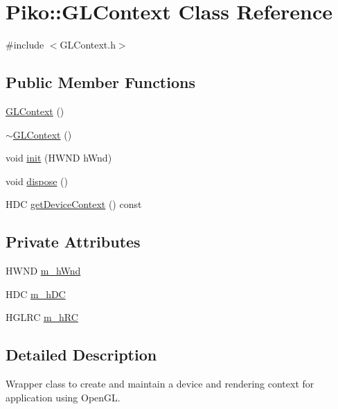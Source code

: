 \hypertarget{class_piko_1_1_g_l_context}{\section{Piko\-:\-:G\-L\-Context Class Reference}
\label{de/d00/class_piko_1_1_g_l_context}
}


{\ttfamily \#include $<$G\-L\-Context.\-h$>$}

\subsection*{Public Member Functions}
\begin{DoxyCompactItemize}
\item 
\hyperlink{class_piko_1_1_g_l_context_a9263cfadfb42a3a7f8fe1afb980b33bf}{G\-L\-Context} ()
\item 
\hyperlink{class_piko_1_1_g_l_context_aec63914bd1b2abca72d7b1cc94803f2f}{$\sim$\-G\-L\-Context} ()
\item 
void \hyperlink{class_piko_1_1_g_l_context_a57e2f8beb718866fa3f931affd369603}{init} (H\-W\-N\-D h\-Wnd)
\item 
void \hyperlink{class_piko_1_1_g_l_context_ae62778cdbfd2f20c72ed81277b1077a8}{dispose} ()
\item 
H\-D\-C \hyperlink{class_piko_1_1_g_l_context_af010829c4b747035b67d877ac2416d2c}{get\-Device\-Context} () const 
\end{DoxyCompactItemize}
\subsection*{Private Attributes}
\begin{DoxyCompactItemize}
\item 
H\-W\-N\-D \hyperlink{class_piko_1_1_g_l_context_ae10ea9016ac413c4c8ecba207eacc9ff}{m\-\_\-h\-Wnd}
\item 
H\-D\-C \hyperlink{class_piko_1_1_g_l_context_a394104e4ba6c80adb3faee26251bd5bc}{m\-\_\-h\-D\-C}
\item 
H\-G\-L\-R\-C \hyperlink{class_piko_1_1_g_l_context_ab0232beca7b587ce3ede831d445d538d}{m\-\_\-h\-R\-C}
\end{DoxyCompactItemize}


\subsection{Detailed Description}
Wrapper class to create and maintain a device and rendering context for application using Open\-G\-L. 

